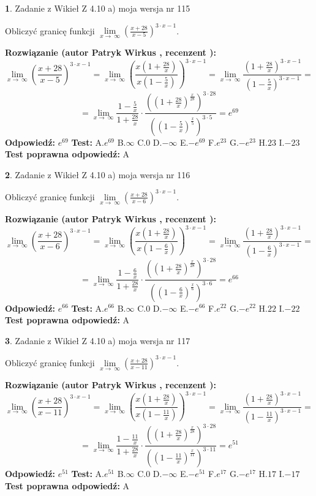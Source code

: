 \documentclass[12pt, a4paper]{article}
\theoremstyle{definition} %
\newtheorem{zad}{}
\newcommand{\zadStart}[1]{\begin{zad}#1\newline}
\newcommand{\zadStop}{\end{zad}}
\newcommand{\rozwStart}[2]{\noindent \textbf{Rozwiązanie (autor #1 , recenzent #2): }\newline}
\newcommand{\rozwStop}{\newline}
\newcommand{\odpStart}{\noindent \textbf{Odpowiedź:}\newline}
\newcommand{\odpStop}{\newline}
\newcommand{\testStart}{\noindent \textbf{Test:}\newline}
\newcommand{\testStop}{\newline}
\newcommand{\kluczStart}{\noindent \textbf{Test poprawna odpowiedź:}\newline}
\newcommand{\kluczStop}{\newline}
\begin{document}
\zadStart{Zadanie z Wikieł Z 4.10 a) moja wersja nr 115}

Obliczyć granicę funkcji  $\lim\limits_{x\to\ \infty}(\frac{x+28}{x-5})^{3\cdot x-1}$.
\zadStop
\rozwStart{Patryk Wirkus}{}
$$\lim\limits_{x\to\ \infty}(\frac{x+28}{x-5})^{3\cdot x-1} = \lim\limits_{x\to\ \infty}(\frac{x(1+\frac{28}{x})}{x(1-\frac{5}{x})})^{3\cdot x-1}=\lim\limits_{x\to\ \infty}\frac{(1+\frac{28}{x})^{3\cdot x-1}}{(1-\frac{5}{x})^{3\cdot x-1}}=$$
$$=\lim\limits_{x\to\ \infty}\frac{1-\frac{5}{x}}{1+\frac{28}{x}}\cdot\frac{((1+\frac{28}{x})^{\frac{x}{28}})^{3\cdot28}}{((1-\frac{5}{x})^{\frac{x}{5}})^{3\cdot5}}=e^{69}$$
\rozwStop
\odpStart
$e^{69}$
\odpStop
\testStart
A.$e^{69}$ B.$\infty$ C.$0$ D.$-\infty$ E.$-e^{69}$
F.$e^{23}$ G.$-e^{23}$
H.$23$
I.$-23$
\testStop
\kluczStart
A
\kluczStop



\zadStart{Zadanie z Wikieł Z 4.10 a) moja wersja nr 116}

Obliczyć granicę funkcji  $\lim\limits_{x\to\ \infty}(\frac{x+28}{x-6})^{3\cdot x-1}$.
\zadStop
\rozwStart{Patryk Wirkus}{}
$$\lim\limits_{x\to\ \infty}(\frac{x+28}{x-6})^{3\cdot x-1} = \lim\limits_{x\to\ \infty}(\frac{x(1+\frac{28}{x})}{x(1-\frac{6}{x})})^{3\cdot x-1}=\lim\limits_{x\to\ \infty}\frac{(1+\frac{28}{x})^{3\cdot x-1}}{(1-\frac{6}{x})^{3\cdot x-1}}=$$
$$=\lim\limits_{x\to\ \infty}\frac{1-\frac{6}{x}}{1+\frac{28}{x}}\cdot\frac{((1+\frac{28}{x})^{\frac{x}{28}})^{3\cdot28}}{((1-\frac{6}{x})^{\frac{x}{6}})^{3\cdot6}}=e^{66}$$
\rozwStop
\odpStart
$e^{66}$
\odpStop
\testStart
A.$e^{66}$ B.$\infty$ C.$0$ D.$-\infty$ E.$-e^{66}$
F.$e^{22}$ G.$-e^{22}$
H.$22$
I.$-22$
\testStop
\kluczStart
A
\kluczStop



\zadStart{Zadanie z Wikieł Z 4.10 a) moja wersja nr 117}

Obliczyć granicę funkcji  $\lim\limits_{x\to\ \infty}(\frac{x+28}{x-11})^{3\cdot x-1}$.
\zadStop
\rozwStart{Patryk Wirkus}{}
$$\lim\limits_{x\to\ \infty}(\frac{x+28}{x-11})^{3\cdot x-1} = \lim\limits_{x\to\ \infty}(\frac{x(1+\frac{28}{x})}{x(1-\frac{11}{x})})^{3\cdot x-1}=\lim\limits_{x\to\ \infty}\frac{(1+\frac{28}{x})^{3\cdot x-1}}{(1-\frac{11}{x})^{3\cdot x-1}}=$$
$$=\lim\limits_{x\to\ \infty}\frac{1-\frac{11}{x}}{1+\frac{28}{x}}\cdot\frac{((1+\frac{28}{x})^{\frac{x}{28}})^{3\cdot28}}{((1-\frac{11}{x})^{\frac{x}{11}})^{3\cdot11}}=e^{51}$$
\rozwStop
\odpStart
$e^{51}$
\odpStop
\testStart
A.$e^{51}$ B.$\infty$ C.$0$ D.$-\infty$ E.$-e^{51}$
F.$e^{17}$ G.$-e^{17}$
H.$17$
I.$-17$
\testStop
\kluczStart
A
\kluczStop
\end{document}
